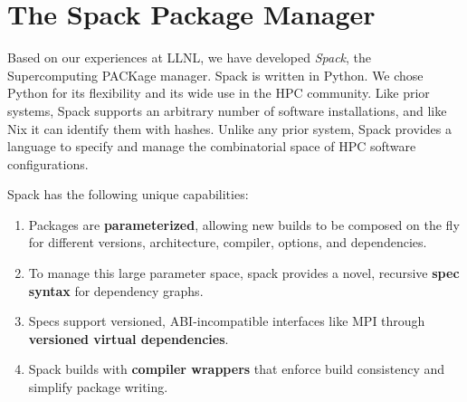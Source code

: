 
\section{The Spack Package Manager}
\label{sec:implementation}
Based on our experiences at LLNL, we have developed
{\it Spack}, the Supercomputing PACKage manager.
Spack is written in Python.  We chose Python for its flexibility
and its wide use in the HPC community.
%
Like prior systems, Spack supports an arbitrary number of software
installations, and like Nix it can identify them with hashes.  Unlike any
prior system, Spack provides a language to specify and manage the
combinatorial space of HPC software configurations.

\noindent
Spack has the following unique capabilities:
\begin{enumerate}
\item Packages are {\bf parameterized}, allowing new builds to be composed
      on the fly for different versions, architecture, compiler, options, 
      and dependencies.
\item To manage this large parameter space, spack provides a novel, 
      recursive {\bf spec syntax} for dependency graphs.
\item Specs support versioned, ABI-incompatible interfaces like MPI through
      {\bf versioned virtual dependencies}.
\item Spack builds with {\bf compiler wrappers} that enforce build
      consistency and simplify package writing.
\end{enumerate}









